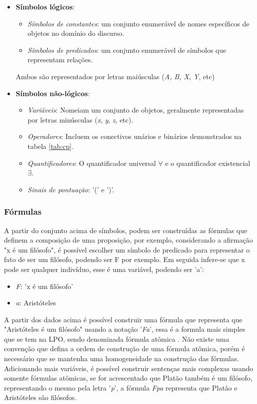 \begin{itemize}
    \item \textbf{Símbolos lógicos}: 
        \begin{itemize}
            \item \textit{Símbolos de constantes}: um conjunto enumerável de nomes específicos de objetos no domínio do discurso.
            \item \textit{Símbolos de predicados}: um conjunto enumerável de símbolos que representam relações.
        \end{itemize}
        Ambos são representados por letras maiúsculas (\textit{A, B, X, Y}, etc)
        
    \item \textbf{Símbolos não-lógicos}:
        \begin{itemize}
            \item \textit{Variáveis}: Nomeiam um conjunto de objetos, geralmente representadas por letras minúsculas (\textit{x}, \textit{y}, \textit{z}, etc).
            \item \textit{Operadores}: Incluem os conectivos unários e binários demonstrados na tabela \ref{tab:cp}.
            \item \textit{Quantificadores}: O quantificador universal $\forall$ e o quantificador existencial $\exists$.
            \item \textit{Sinais de pontuação}:  '(' e ')'.
        \end{itemize}
\end{itemize}

\subsubsection{Fórmulas}

A partir do conjunto acima de símbolos, podem ser construídas as fórmulas que definem a composição de uma proposição, por exemplo, considerando a afirmação "x é um filósofo", é possível escolher um símbolo de predicado para representar o fato de ser um filósofo, podendo ser F por exemplo. Em seguida infere-se que x pode ser qualquer indivíduo, esse é uma variável, podendo ser 'a':

\begin{itemize}
    \item \textit{F}: 'x é um filósofo'
    \item \textit{a}: Aristóteles
\end{itemize}

A partir dos dados acima é possível construir uma fórmula que representa que "Aristóteles é um filósofo" usando a notação '\textit{Fa}', essa é a formula mais simples que se tem na LPO, sendo denominada fórmula atômica \cite{mortari2001}. Não existe uma convenção que defina a ordem de construção de uma fórmula atômica, porém é necessário que se mantenha uma homogeneidade na construção das fórmulas. Adicionando mais variáveis, é possível construir sentenças mais complexas usando somente fórmulas atômicas, se for acrescentado que Platão também é um filósofo, representando o mesmo pela letra '\textit{p}', a fórmula \textit{Fpa} representa que Platão e Aristóteles são filósofos.

